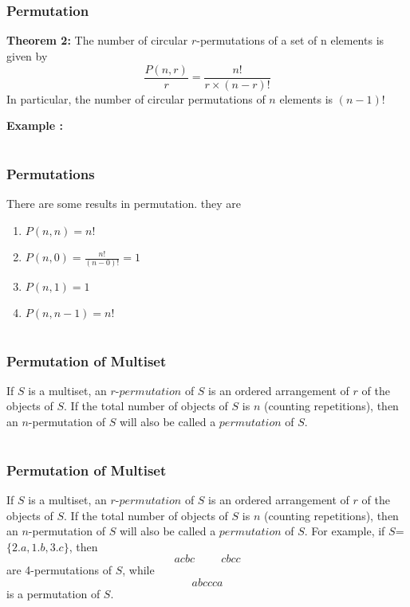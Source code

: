 \documentclass{beamer}
\begin{document}
\section{}
 \begin{frame}
\frametitle{Permutation}
{\bf Theorem 2: } The number of circular $r$-permutations of a set of n elements is given by
                               $$\frac{P(n,r)}{r}   =  \frac{n!}{r\times(n-r)!}$$
In particular, the number of circular permutations of $n$ elements is $(n-1)!$

{\bf Example :}

\end{frame}

\section{}
 \begin{frame}
\frametitle{Permutations}
There are some results in permutation. they are {\vspace{.5cm}}
   \begin{enumerate}
     \item $P(n,n)=n!${\vspace{.3cm}}
     \item $P(n,0)=\frac{n!}{(n-0)!}=1${\vspace{.3cm}}
     \item $P(n,1)=1${\vspace{.3cm}}
     \item $P(n,n-1)=n!$
\end{enumerate}
\end{frame}

\section{}
 \begin{frame}
\frametitle{Permutation of Multiset}
If $S$ is a multiset, an $r$-$permutation$ of $S$ is an ordered arrangement of $r$ of the objects of $S$. If the total number of objects of $S$ is $n$ (counting repetitions), then an $n$-permutation of $S$ will also be called a $permutation$ of $S$.
\end{frame}


\section{}
 \begin{frame}
\frametitle{Permutation of Multiset}
If $S$ is a multiset, an $r$-$permutation$ of $S$ is an ordered arrangement of $r$ of the objects of $S$. If the total number of objects of $S$ is $n$ (counting repetitions), then an $n$-permutation of $S$ will also be called a $permutation$ of $S$. For example, if $S$= $\{2.a, 1.b, 3.c\}$, then
       $$acbc \hspace{1cm} cbcc$$
       are 4-permutations of $S$, while
       $$abccca$$
is a permutation of $S$.
\end{frame}
\end{document}
